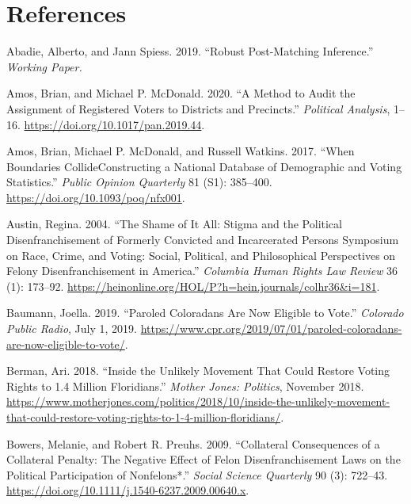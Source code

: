 \documentclass[
  12pt,
]{article}
\newlength{\cslhangindent}
\newenvironment{cslreferences}%
  {\setlength{\parindent}{0pt}%
  \everypar{\setlength{\hangindent}{\cslhangindent}}\ignorespaces}%
  {\par}
\begin{document}
\newpage

\hypertarget{references}{%
\section*{References}\label{references}}

\hypertarget{refs}{}
\begin{cslreferences}
\leavevmode\hypertarget{ref-Abadie2019}{}%
Abadie, Alberto, and Jann Spiess. 2019. ``Robust Post-Matching Inference.'' \emph{Working Paper.}

\leavevmode\hypertarget{ref-Amos2020}{}%
Amos, Brian, and Michael P. McDonald. 2020. ``A Method to Audit the Assignment of Registered Voters to Districts and Precincts.'' \emph{Political Analysis}, 1--16. \url{https://doi.org/10.1017/pan.2019.44}.

\leavevmode\hypertarget{ref-Amos2017}{}%
Amos, Brian, Michael P. McDonald, and Russell Watkins. 2017. ``When Boundaries CollideConstructing a National Database of Demographic and Voting Statistics.'' \emph{Public Opinion Quarterly} 81 (S1): 385--400. \url{https://doi.org/10.1093/poq/nfx001}.

\leavevmode\hypertarget{ref-Austin2004}{}%
Austin, Regina. 2004. ``The Shame of It All: Stigma and the Political Disenfranchisement of Formerly Convicted and Incarcerated Persons Symposium on Race, Crime, and Voting: Social, Political, and Philosophical Perspectives on Felony Disenfranchisement in America.'' \emph{Columbia Human Rights Law Review} 36 (1): 173--92. \url{https://heinonline.org/HOL/P?h=hein.journals/colhr36\&i=181}.

\leavevmode\hypertarget{ref-Baumann2019}{}%
Baumann, Joella. 2019. ``Paroled Coloradans Are Now Eligible to Vote.'' \emph{Colorado Public Radio}, July 1, 2019. \url{https://www.cpr.org/2019/07/01/paroled-coloradans-are-now-eligible-to-vote/}.

\leavevmode\hypertarget{ref-Berman2018}{}%
Berman, Ari. 2018. ``Inside the Unlikely Movement That Could Restore Voting Rights to 1.4 Million Floridians.'' \emph{Mother Jones: Politics}, November 2018. \url{https://www.motherjones.com/politics/2018/10/inside-the-unlikely-movement-that-could-restore-voting-rights-to-1-4-million-floridians/}.

\leavevmode\hypertarget{ref-Bowers2009}{}%
Bowers, Melanie, and Robert R. Preuhs. 2009. ``Collateral Consequences of a Collateral Penalty: The Negative Effect of Felon Disenfranchisement Laws on the Political Participation of Nonfelons*.'' \emph{Social Science Quarterly} 90 (3): 722--43. \url{https://doi.org/10.1111/j.1540-6237.2009.00640.x}.


\end{cslreferences}
\end{document}
